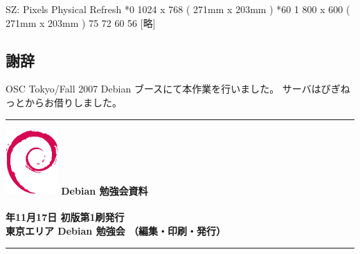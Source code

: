 \documentclass[mingoth,a4paper]{jsarticle}
\newcommand{\debmtgyear}{2007}
\newcommand{\debmtgdate}{17}
\newcommand{\debmtgmonth}{11}
\begin{document}
\begin{commandline}
 SZ:    Pixels          Physical       Refresh
*0   1024 x 768    ( 271mm x 203mm )  *60  
 1    800 x 600    ( 271mm x 203mm )   75   72   60   56  
[略]
\end{commandline}

\subsection{謝辞}

OSC Tokyo/Fall 2007 Debian ブースにて本作業を行いました。
サーバはびぎねっとからお借りしました。






\cleartooddpage

\begin{minipage}[b]{0.2\hsize}
 \colorbox{dancerlightblue}{}
\end{minipage}
\begin{minipage}[b]{0.8\hsize}

\vspace*{15cm}
{\color{dancerlightblue}\rule{\hsize}{1mm}}
\vspace{2mm}
\includegraphics[width=2cm]{image200502/openlogo-nd.eps}
\noindent \Large \bf Debian 勉強会資料\\ \\
\noindent \normalfont \debmtgyear{}年\debmtgmonth{}月\debmtgdate{}日 \hspace{5mm}  初版第1刷発行\\
\noindent \normalfont 東京エリア Debian 勉強会 （編集・印刷・発行）\\
{\color{dancerdarkblue}\rule{\hsize}{1mm}}
\end{minipage}
\end{document}
